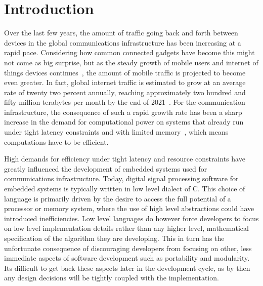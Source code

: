
%
%

\chapter{Introduction}

Over the last few years, the amount of traffic going back and forth between devices in the global communications infrastructure has been increasing at a rapid pace. Considering how common connected gadgets have become this might not come as big surprise, but as the steady growth of mobile users and internet of things devices continues~\cite{ericsson2016}, the amount of mobile traffic is projected to become even greater. In fact, global internet traffic is estimated to grow at an average rate of twenty two percent annually, reaching approximately two hundred and fifty million terabytes per month by the end of 2021~\cite{cisco2016}. For the communication infrastructure, the consequence of such a rapid growth rate has been a sharp increase in the demand for computational power on systems that already run under tight latency constraints and with limited memory~\cite{persson2014}, which means computations have to be efficient.

High demands for efficiency under tight latency and resource constraints have greatly influenced the development of embedded systems used for communications infrastructure. Today, digital signal processing software for embedded systems is typically written in low level dialect of C. This choice of language is primarily driven by the desire to access the full potential of a processor or memory system, where the use of high level abstractions could have introduced inefficiencies. Low level languages do however force developers to focus on low level implementation details rather than any higher level, mathematical specification of the algorithm they are developing. This in turn has the unfortunate consequence of discouraging developers from focusing on other, less immediate aspects of software development such as portability and modularity. Its difficult to get back these aspects later in the development cycle, as by then any design decisions will be tightly coupled with the implementation.


